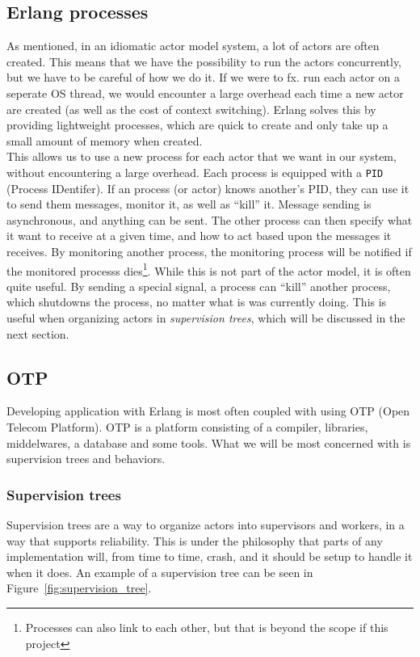 \documentclass[a4paper]{article}
\newcommand\figref[1]{Figure~\ref{#1}}
\begin{document}
\subsection{Erlang processes}
As mentioned, in an idiomatic actor model system, a lot of actors are often
created. This means that we have the possibility to run the actors concurrently,
but we have to be careful of how we do it. If we were to fx. run each actor on a
seperate OS thread, we would encounter a large overhead each time a new actor
are created (as well as the cost of context switching). Erlang solves this by
providing lightweight processes, which are quick to create and only take up a
small amount of memory when created.\\

\noindent This allows us to use a new process for each actor that we want in our
system, without encountering a large overhead. Each process is equipped with a
\texttt{PID} (Process IDentifer). If an process (or actor) knows another's PID,
they can use it to send them messages, monitor it, as well as ``kill'' it.
Message sending is asynchronous, and anything can be sent. The other process can
then specify what it want to receive at a given time, and how to act based upon
the messages it receives. By monitoring another process, the monitoring process
will be notified if the monitored processs dies\footnote{Processes can also link
to each other, but that is beyond the scope if this project}. While this is not
part of the actor model, it is often quite useful. By sending a special signal,
a process can ``kill'' another process, which shutdowns the process, no matter
what is was currently doing. This is useful when organizing actors in
\textit{supervision trees}, which will be discussed in the next section.

\subsection{OTP}
Developing application with Erlang is most often coupled with using OTP (Open
Telecom Platform). OTP is a platform consisting of a compiler, libraries,
middelwares, a database and some tools. What we will be most concerned with is
supervision trees and behaviors.

\subsubsection{Supervision trees}
Supervision trees are a way to organize actors into supervisors and workers, in
a way that supports reliability. This is under the philosophy that parts of any
implementation will, from time to time, crash, and it should be setup to handle
it when it does. An example of a supervision tree can be seen in
\figref{fig:supervision_tree}.
\end{document}
